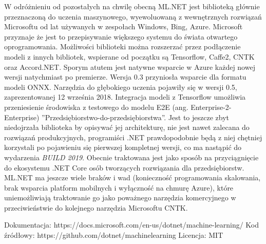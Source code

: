 \documentclass[12pt,a4paper,twoside,titlepage,openright]{book}
\begin{document}
W odróżnieniu od pozostałych na chwilę obecną ML.NET jest biblioteką głównie przeznaczoną do uczenia maszynowego, wyewoluowaną z wewnętrznych rozwiązań Microsoftu od lat używanych w zespołach Windows, Bing, Azure. Microsoft przyznaje że jest to przepisywanie większego systemu do świata otwartego oprogramowania.\cite{siteMLNet} Możliwości biblioteki można rozszerzać przez podłączenie modeli z innych bibliotek, wspierane od początku są Tensorflow, Caffe2, CNTK oraz Accord.NET. Sporym atutem jest natywne wsparcie w Azure każdej nowej wersji natychmiast po premierze. Wersja 0.3 przyniosła wsparcie dla formatu modeli ONNX. Narzędzia do głębokiego uczenia pojawiły się w wersji 0.5, zaprezentowanej 12 września 2018. Integracja modeli z Tensorflow umożliwia przeniesienie środowiska z testowego do modelu E2E (ang. Enterprise-2-Enterprise) ''Przedsiębiorstwo-do-przedsiębiorstwa''. Jest to jeszcze zbyt niedojrzała biblioteka by opisywać jej architekturę, nie jest nawet zalecana do rozwiązań produkcyjnych, programiści .NET prawdopodobnie będą z niej chętniej korzystali po pojawieniu się pierwszej kompletnej wersji, co ma nastąpić do wydarzenia \textit{BUILD 2019}. Obecnie traktowana jest jako sposób na przyciągnięcie do ekosystemu .NET Core osób tworzących rozwiązania dla przedsiębiorstw. ML.NET ma jeszcze wiele braków i wad (konieczność programowania skalowania, brak wsparcia platform mobilnych i wyłączność na chmurę Azure), które uniemożliwiają traktowanie go jako poważnego narzędzia komercyjnego w przeciwieństwie do kolejnego narzędzia Microsoftu CNTK.

\noindent
\newline
Dokumentacja: https://docs.microsoft.com/en-us/dotnet/machine-learning/
\newline
Kod źródłowy: https://github.com/dotnet/machinelearning
\newline
Licencja: MIT
\end{document}
